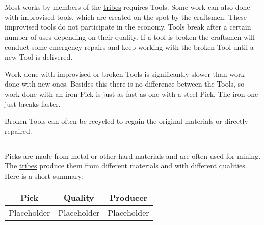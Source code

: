 \section{}\label{ch:Goods:Tools}

Most works by members of the \hyperref[ch:Tribes]{tribes} requires
\glspl{Tool}. Some work can also done with improvised tools, which are created
on the spot by the craftsmen. These improvised tools do not participate in the
economy. \Glspl{Tool} break after a certain number of uses depending on their
quality. If a tool is broken the craftsmen will conduct some emergency repairs
and keep working with the broken \gls{Tool} until a new \gls{Tool} is
delivered.

Work done with improvised or broken \glspl{Tool} is significantly slower than
work done with new ones. Besides this there is no difference between the
\glspl{Tool}, so work done with an iron \gls{Pick} is just as fast as one with
a steel \gls{Pick}. The iron one just breaks faster.

Broken \glspl{Tool} can often be recycled to regain the original materials or
directly repaired.

\subsection{}

\Glspl{Pick} are made from metal or other hard materials and are often used for mining.
The \hyperref[ch:Tribes]{tribes} produce them from different materials and with different
qualities.
Here is a short summary:

\begin{longtable}{ccc}
	\toprule
	\Gls*{Pick} & Quality     & Producer    \\
	\midrule
	Placeholder & Placeholder & Placeholder \\
	\bottomrule
\end{longtable}

